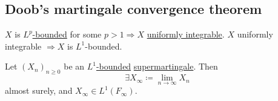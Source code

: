 \documentclass{article}
\newcommand{\1}[1]{\mathbbm{1}_{#1}}
\newcommand{\E}{\mathbb{E}}
\begin{document}
\subsection{Doob's martingale convergence theorem}
\begin{remark}
  $X$ is \hyperlink{def:lpbounded}{$L^p$-bounded} for some $p > 1 \Rightarrow X$ \hyperlink{def:ui}{uniformly integrable}.
  $X$ uniformly integrable $\Rightarrow X$ is $L^1$-bounded.
\end{remark}
\begin{nthm}\label{thm:2.13}
  Let $(X_n)_{n \geq 0}$ be an \hyperlink{def:lpbounded}{$L^1$-bounded} \hyperlink{def:martingale}{supermartingale}. Then
  \begin{equation*}
    \exists X_\infty \coloneqq \lim_{n \to \infty} X_n
  \end{equation*}
  almost surely, and $X_\infty \in L^1(F_\infty)$.
\end{nthm}
\end{document}
